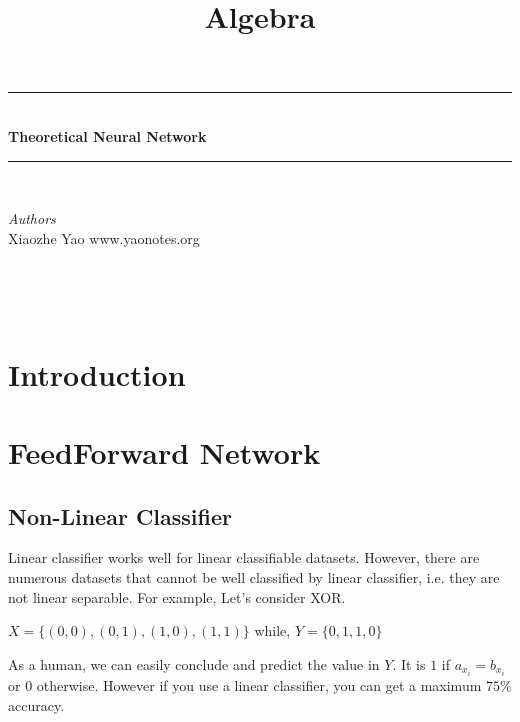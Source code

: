 \documentclass[12pt,openany]{book}
\title{Algebra}
\theoremstyle{definition}
\theoremstyle{definition}
\newcommand{\HRule}{\rule{\linewidth}{0.5mm}} %
\begin{document}
 

\begin{center}
\HRule \\[0.4cm]
{ \huge \bfseries Theoretical Neural Network}\\[0.4cm] %
\HRule \\[1.5cm]
\begin{minipage}{0.4\textwidth}
\begin{flushleft} \large
\emph{Authors}\\
Xiaozhe Yao \newline
www.yaonotes.org \newline

\end{flushleft}
\end{minipage}
~
\begin{minipage}{0.4\textwidth}
\begin{flushright} \large

\end{flushright}
\end{minipage}\\[0.5cm]
\end{center}

\chapter{Introduction}

\chapter{FeedForward Network}

\section{Non-Linear Classifier}

Linear classifier works well for linear classifiable datasets. However, there are numerous datasets that cannot be well classified by linear classifier, i.e. they are not linear separable. For example, Let's consider XOR.

$X=\{(0,0),(0,1),(1,0),(1,1)\}$ while,
$Y=\{0,1,1,0\}$

As a human, we can easily conclude and predict the value in $Y$. It is $1$ if $a_{x_i} = b_{x_i}$ or $0$ otherwise. However if you use a linear classifier, you can get a maximum $75\%$ accuracy.
\end{document}
